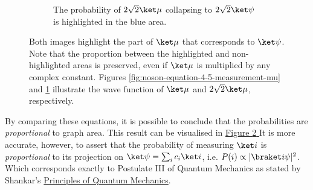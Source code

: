 \begin{figure}[htb]
\begin{subfigure}[t]{0.45\textwidth}
        \caption{The probability of $2 \sqrt 2 \ket \mu$ collapsing to $2 \sqrt 2 \ket \psi$ is
            highlighted in the blue area.}
        \label{fig:noson-equation-4-5-measurement-2-sqrt2-mu}
    \end{subfigure}
    \captionsetup{width=0.9\textwidth}
    \caption{Both images highlight the part of $\ket \mu$ that corresponds to $\ket \psi$.
        Note that the proportion between the highlighted and non-highlighted areas is preserved,
        even if $\ket \mu$ is multiplied by any complex constant.
        Figures \ref{fig:noson-equation-4-5-measurement-mu} and
        \ref{fig:noson-equation-4-5-measurement-2-sqrt2-mu}
        illustrate the wave function of
        $\ket \mu$ and $2 \sqrt2 \ket \mu$, respectively.}
    \label{fig:noson-equation-4-5-measurement-probabilities}
\end{figure}

By comparing these equations,
it is possible to conclude that
the probabilities are \emph{proportional} to graph area.
This result can be visualised in
\hyperref[fig:noson-equation-4-5-measurement-probabilities]{
    Figure \ref{fig:noson-equation-4-5-measurement-probabilities}
}
It is more accurate, however, to assert that
the probability of measuring $\ket i$ is \emph{proportional}
to its projection on $\ket \psi = \sum_i c_i \ket i$,
i.e. $P(i) \propto |\braket i \psi |^2$.
Which corresponds exactly to Postulate III of Quantum Mechanics as stated by
Shankar's \hyperlink{https://www.springer.com/br/book/9780306447907}{Principles of Quantum Mechanics}.